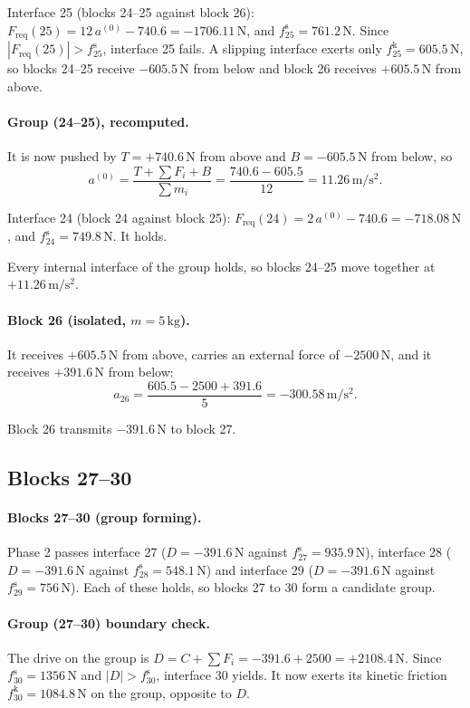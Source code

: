 \documentclass[11pt,a4paper]{article}
\begin{document}
Interface 25 (blocks 24--25 against block 26): $F_{\mathrm{req}}(25)=12\,a^{(0)} - 740.6=-1706.11\,\mathrm{N}$, and $f^{\mathrm s}_{25}=761.2\,\mathrm{N}$. Since $|F_{\mathrm{req}}(25)|>f^{\mathrm s}_{25}$, interface 25 fails. A slipping interface exerts only $f^{\mathrm k}_{25}=605.5\,\mathrm{N}$, so blocks 24--25 receive $-605.5\,\mathrm{N}$ from below and block 26 receives $+605.5\,\mathrm{N}$ from above.

\paragraph{Group (24--25), recomputed.} It is now pushed by $T=+740.6\,\mathrm{N}$ from above and $B=-605.5\,\mathrm{N}$ from below, so\[a^{(0)}=\dfrac{T+\sum F_i+B}{\sum m_i}=\dfrac{740.6 - 605.5}{12}=11.26\,\mathrm{m/s^2}.\]

Interface 24 (block 24 against block 25): $F_{\mathrm{req}}(24)=2\,a^{(0)} - 740.6=-718.08\,\mathrm{N}$, and $f^{\mathrm s}_{24}=749.8\,\mathrm{N}$. It holds.

Every internal interface of the group holds, so blocks 24--25 move together at $+11.26\,\mathrm{m/s^2}$.

\paragraph{Block 26 (isolated, $m=5\,\mathrm{kg}$).} It receives $+605.5\,\mathrm{N}$ from above, carries an external force of $-2500\,\mathrm{N}$, and it receives $+391.6\,\mathrm{N}$ from below:\[a_{26}=\dfrac{605.5 - 2500 + 391.6}{5}=-300.58\,\mathrm{m/s^2}.\]

Block 26 transmits $-391.6\,\mathrm{N}$ to block 27.

\subsection{Blocks 27--30}
\paragraph{Blocks 27--30 (group forming).} Phase 2 passes interface 27 ($D=-391.6\,\mathrm{N}$ against $f^{\mathrm s}_{27}=935.9\,\mathrm{N}$), interface 28 ($D=-391.6\,\mathrm{N}$ against $f^{\mathrm s}_{28}=548.1\,\mathrm{N}$) and interface 29 ($D=-391.6\,\mathrm{N}$ against $f^{\mathrm s}_{29}=756\,\mathrm{N}$). Each of these holds, so blocks 27 to 30 form a candidate group.

\paragraph{Group (27--30) boundary check.} The drive on the group is $D=C+\sum F_i=-391.6 + 2500=+2108.4\,\mathrm{N}$. Since $f^{\mathrm s}_{30}=1356\,\mathrm{N}$ and $|D|>f^{\mathrm s}_{30}$, interface 30 yields. It now exerts its kinetic friction $f^{\mathrm k}_{30}=1084.8\,\mathrm{N}$ on the group, opposite to $D$.
\end{document}
